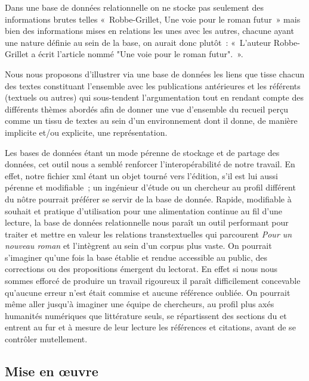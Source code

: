     Dans une base de données relationnelle on ne stocke pas seulement des informations brutes telles «~Robbe-Grillet, Une voie pour le roman futur~» mais bien des informations mises en relations les unes avec les autres, chacune ayant une nature définie au sein de la base, on aurait donc plutôt~: «~L'auteur Robbe-Grillet a écrit l'article nommé "Une voie pour le roman futur".~».

    Nous nous proposons d'illustrer via une base de données les liens que tisse chacun des textes constituant l'ensemble avec les publications antérieures et les référents (textuels ou autres) qui sous-tendent l'argumentation tout en rendant compte des différents thèmes abordés afin de donner une vue d'ensemble du recueil perçu comme un tissu de textes au sein d'un environnement dont il donne, de manière implicite et/ou explicite, une représentation.

    Les bases de données étant un mode pérenne de stockage et de partage des données, cet outil nous a semblé renforcer l'interopérabilité de notre travail. En effet, notre fichier xml étant un objet tourné vers l'édition, s'il est lui aussi pérenne et modifiable~; un ingénieur d'étude ou un chercheur au profil différent du nôtre pourrait préférer se servir de la base de donnée. Rapide, modifiable à souhait et pratique d'utilisation pour une alimentation continue au fil d'une lecture, la base de données relationnelle nous paraît un outil performant pour traiter et mettre en valeur les relations transtextuelles qui parcourent \textit{Pour un nouveau roman} et l'intègrent au sein d'un corpus plus vaste. On pourrait s'imaginer qu'une fois la base établie et rendue accessible au public, des corrections ou des propositions émergent du lectorat. En effet si nous nous sommes efforcé de produire un travail rigoureux il paraît difficilement concevable qu'aucune erreur n'est était commise et aucune référence oubliée. On pourrait même aller jusqu'à imaginer une équipe de chercheurs, au profil plus axés humanités numériques que littérature seuls, se répartissent des sections du \punr{} et entrent au fur et à mesure de leur lecture les références et citations, avant de se contrôler mutellement. 
    \subsection{Mise en œuvre}
